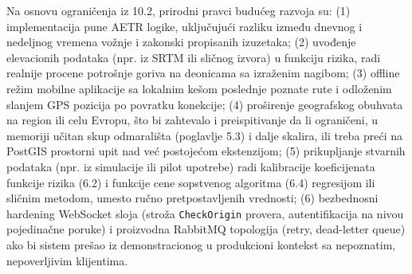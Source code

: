 Na osnovu ograničenja iz 10.2, prirodni pravci budućeg razvoja su: (1) implementacija pune AETR logike, uključujući razliku između dnevnog i nedeljnog vremena vožnje i zakonski propisanih izuzetaka; (2) uvođenje elevacionih podataka (npr. iz SRTM ili sličnog izvora) u funkciju rizika, radi realnije procene potrošnje goriva na deonicama sa izraženim nagibom; (3) offline režim mobilne aplikacije sa lokalnim kešom poslednje poznate rute i odloženim slanjem GPS pozicija po povratku konekcije; (4) proširenje geografskog obuhvata na region ili celu Evropu, što bi zahtevalo i preispitivanje da li ograničeni, u memoriji učitan skup odmarališta (poglavlje 5.3) i dalje skalira, ili treba preći na PostGIS prostorni upit nad već postojećom ekstenzijom; (5) prikupljanje stvarnih podataka (npr. iz simulacije ili pilot upotrebe) radi kalibracije koeficijenata funkcije rizika (6.2) i funkcije cene sopstvenog algoritma (6.4) regresijom ili sličnim metodom, umesto ručno pretpostavljenih vrednosti; (6) bezbednosni hardening WebSocket sloja (stroža \texttt{CheckOrigin} provera, autentifikacija na nivou pojedinačne poruke) i proizvodna RabbitMQ topologija (retry, dead-letter queue) ako bi sistem prešao iz demonstracionog u produkcioni kontekst sa nepoznatim, nepoverljivim klijentima.

\clearpage
